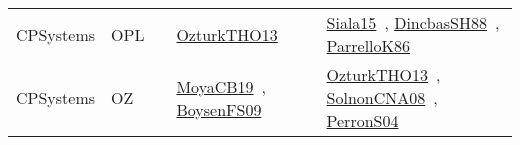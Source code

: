 {\begin{longtable}{lp{3cm}>{\raggedright\arraybackslash}p{6cm}>{\raggedright\arraybackslash}p{6cm}>{\raggedright\arraybackslash}p{8cm}}
CPSystems & OPL &  & \href{../cars/works/OzturkTHO13.pdf}{OzturkTHO13}~\cite{OzturkTHO13} & \href{../cars/works/Siala15.pdf}{Siala15}~\cite{Siala15}, \href{../cars/works/DincbasSH88.pdf}{DincbasSH88}~\cite{DincbasSH88}, \href{../cars/works/ParrelloK86.pdf}{ParrelloK86}~\cite{ParrelloK86}\\
CPSystems & OZ &  & \href{../cars/works/MoyaCB19.pdf}{MoyaCB19}~\cite{MoyaCB19}, \href{../cars/works/BoysenFS09.pdf}{BoysenFS09}~\cite{BoysenFS09} & \href{../cars/works/OzturkTHO13.pdf}{OzturkTHO13}~\cite{OzturkTHO13}, \href{../cars/works/SolnonCNA08.pdf}{SolnonCNA08}~\cite{SolnonCNA08}, \href{../cars/works/PerronS04.pdf}{PerronS04}~\cite{PerronS04}\\
\end{longtable}
}

